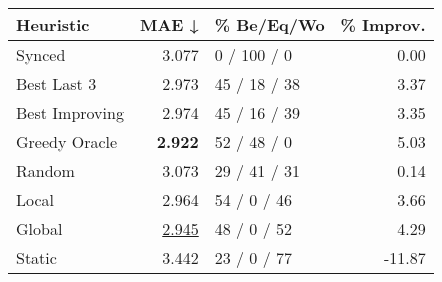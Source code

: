 \begin{tabular}{lrlr}
\toprule
\textbf{Heuristic} & \textbf{MAE ↓} & \textbf{\% Be/Eq/Wo} & \textbf{\% Improv.} \\
\midrule
            Synced &          3.077 &          0 / 100 / 0 &                0.00 \\
\midrule
       Best Last 3 &          2.973 &         45 / 18 / 38 &                3.37 \\
    Best Improving &          2.974 &         45 / 16 / 39 &                3.35 \\
\addlinespace
     Greedy Oracle &          \textbf{2.922} &          52 / 48 / 0 &                5.03 \\
            Random &          3.073 &         29 / 41 / 31 &                0.14 \\
\midrule
             Local &          2.964 &          54 / 0 / 46 &                3.66 \\
            Global &          \underline{2.945} &          48 / 0 / 52 &                4.29 \\
\midrule
            Static &          3.442 &          23 / 0 / 77 &              -11.87 \\
\bottomrule
\end{tabular}

\label{tab:ds_non_lr05_le1_bs2_Summary}
